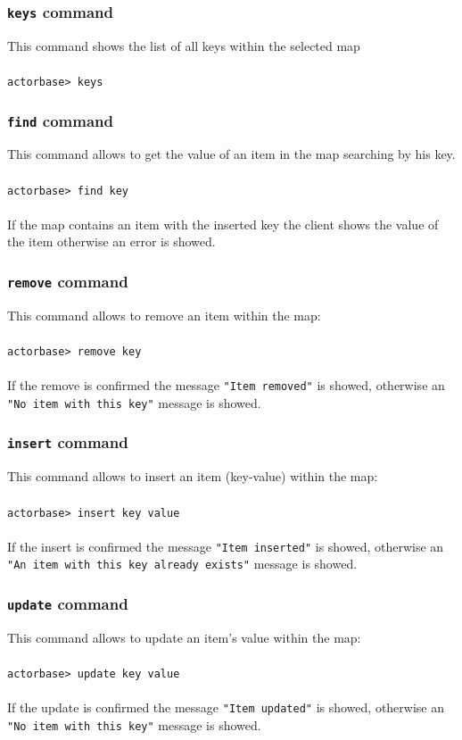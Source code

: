 \documentclass[a4paper]{article}
\begin{document}
	\subsubsection{\texttt{keys} command}
	This command shows the list of all keys within the selected map
	\\ \\
	\texttt{actorbase>	keys}

	\subsubsection{\texttt{find} command}
	This command allows to get the value of an item in the map searching by his key.
	\\ \\
	\texttt{actorbase>	find key}
	\\ \\
	If the map contains an item with the inserted key the client shows the value of the item otherwise an error is showed.
	\subsubsection{\texttt{remove} command}
	This command allows to remove an item within the map:
	\\ \\
	\texttt{actorbase>	remove key}
	\\ \\
	If the remove is confirmed the message \texttt{"Item removed"} is showed, otherwise an \texttt{"No item with this key"} message is showed.

	\subsubsection{\texttt{insert} command}
	This command allows to insert an item (key-value) within the map:
	\\ \\
	\texttt{actorbase>	insert key value}
	\\ \\
	If the insert is confirmed the message \texttt{"Item inserted"} is showed, otherwise an \texttt{"An item with this key already exists"} message is showed.
	
	\subsubsection{\texttt{update} command}
	This command allows to update an item's value within the map:
	\\ \\
	\texttt{actorbase>	update key value}
	\\ \\
	If the update is confirmed the message \texttt{"Item updated"} is showed, otherwise an \texttt{"No item with this key"} message is showed.
	
\end{document}
